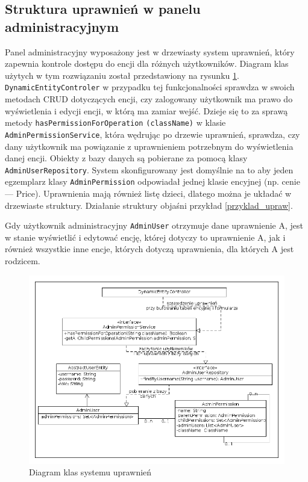 \subsection{Struktura uprawnień w panelu administracyjnym}
Panel administracyjny wyposażony jest w drzewiasty system uprawnień, który zapewnia kontrole dostępu do encji dla różnych użytkowników. Diagram klas użytych w tym rozwiązaniu został przedstawiony na rysunku \ref{klasy_uprawnienia}. \texttt{DynamicEntityControler} w przypadku tej funkcjonalności sprawdza w swoich metodach CRUD dotyczących encji, czy zalogowany użytkownik ma prawo do wyświetlenia i edycji encji, w którą ma zamiar wejść. Dzieje się to za sprawą metody \texttt{hasPermissionForOperation}
\texttt{(className)} w klasie \texttt{AdminPermissionService}, która wędrując po drzewie uprawnień, sprawdza, czy dany użytkownik ma powiązanie z uprawnieniem potrzebnym do wyświetlenia danej encji. Obiekty z bazy danych są pobierane za pomocą klasy \texttt{AdminUserRepository}. System skonfigurowany jest domyślnie na to aby jeden egzemplarz klasy \texttt{AdminPermission} odpowiadał jednej klasie encyjnej (np. cenie — Price). Uprawnienia mają również listę dzieci, dlatego można je układać w drzewiaste struktury. Działanie struktury objaśni przykład \ref{przyklad_upraw}.
\begin{example}
	\label{przyklad_upraw}
	Gdy użytkownik administracyjny \texttt{AdminUser} otrzymuje dane uprawnienie A, jest w stanie wyświetlić i edytować encję, której dotyczy to uprawnienie A, jak i również wszystkie inne encje, których dotyczą uprawnienia, dla których A jest rodzicem. 
\end{example}
\begin{figure}
	\begin{center}
		\includegraphics[scale=0.4]{klasy_uprawnienia.png}
	\end{center}
	\caption{{\color{black}Diagram klas systemu uprawnień}} \label{klasy_uprawnienia}
\end{figure}

